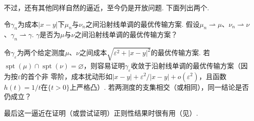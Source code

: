 不过，还有其他同样自然的逼近，至今仍是开放问题. 下面列出两个.
\begin{openproblem}[单调传输的稳定性]
令$\gamma_n$为成本$|x-y|$下$\mu_n$与$\nu_n$之间沿射线单调的最优传输方案. 假设$\mu_n\rightharpoonup\mu$、$\nu_n\rightharpoonup\nu$、$\gamma_n\rightharpoonup\gamma$. $\gamma$是否为$\mu$与$\nu$之间沿射线单调的最优传输方案？
\end{openproblem}
\begin{openproblem}[正则化距离成本的极限]
令$\gamma_\varepsilon$为两个给定测度$\mu$、$\nu$之间成本$\sqrt{\varepsilon^2+|x-y|^2}$的最优传输方案. 若$\operatorname{spt}(\mu)\cap\operatorname{spt}(\nu)=\varnothing$，则容易证明$\gamma_\varepsilon$收敛于沿射线单调的最优传输方案（因为按$\varepsilon$的首个非\label{idx:i5-p101}
零阶，成本扰动形如$|x-y|+\varepsilon^2/|x-y|+o(\varepsilon^2)$，且函数$h(t)=1/t$在$\{t>0\}$上严格凸）. 若两测度的支集相交（或相同），同一结论是否仍成立？
\end{openproblem}
最后这一逼近在证明（或尝试证明）正则性结果时很有用（见\cite{b210}）.
